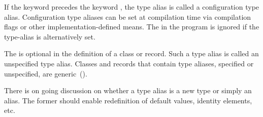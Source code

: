 If the keyword  precedes the keyword , the
type alias is called a configuration type alias.  Configuration type
aliases can be set at compilation time via compilation flags or other
implementation-defined means.  The  in the
program is ignored if the type-alias is alternatively set.

The  is optional in the definition of a class or
record.  Such a type alias is called an unspecified type
alias. Classes and records that contain type aliases, specified or
unspecified, are generic~().

\begin{openissue}
There is on going discussion on whether a type alias is a new
type or simply an alias.  The former should enable redefinition of
default values, identity elements, etc.
\end{openissue}
